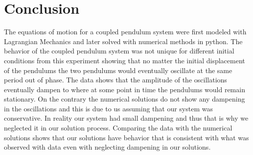 \documentclass[twocolumn]{article}
\begin{document}
\section*{Conclusion}
The equations of motion for a coupled pendulum system were first modeled with Lagrangian Mechanics and later solved with numerical methods in python. The behavior of the coupled pendulum system was not unique for different initial conditions from this experiment showing that no matter the initial displacement of the pendulums the two pendulums would eventually oscillate at the same period out of phase. The data shows that the amplitude of the oscillations eventually dampen to where at some point in time the pendulums would remain stationary. On the contrary the numerical solutions do not show any dampening in the oscillations and this is due to us assuming that our system was conservative. In reality our system had small dampening and thus that is why we neglected it in our solution process. Comparing the data with the numerical solutions shows that our solutions have behavior that is consistent with what was observed with data even with neglecting dampening in our solutions.
\newpage
\end{document}
